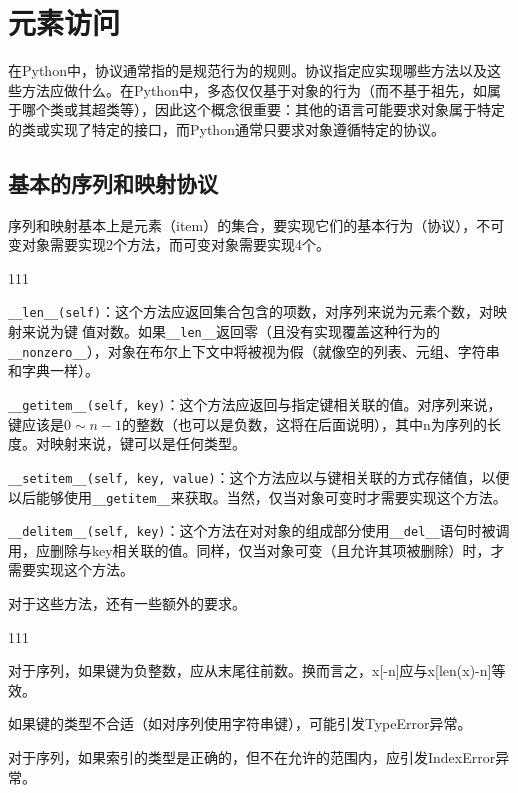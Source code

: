 \section{元素访问}
\begin{tcolorbox}
在Python中，协议通常指的是规范行为的规则。协议指定应实现哪些方法以及这些方法应做什么。在Python中，多态仅仅基于对象的行为（而不基于祖先，如属于哪个类或其超类等），因此这个概念很重要：其他的语言可能要求对象属于特定的类或实现了特定的接口，而Python通常只要求对象遵循特定的协议。
\end{tcolorbox}

\subsection{基本的序列和映射协议}
序列和映射基本上是元素（item）的集合，要实现它们的基本行为（协议），不可变对象需要实现2个方法，而可变对象需要实现4个。

\begin{dinglist}{111}
	\item \verb|__len__(self)|：这个方法应返回集合包含的项数，对序列来说为元素个数，对映射来说为键值对数。如果\verb|__len__|返回零（且没有实现覆盖这种行为的\verb|__nonzero__|），对象在布尔上下文中将被视为假（就像空的列表、元组、字符串和字典一样）。
	\item \verb|__getitem__(self, key)|：这个方法应返回与指定键相关联的值。对序列来说，键应该是$0\sim n-1$的整数（也可以是负数，这将在后面说明），其中n为序列的长度。对映射来说，键可以是任何类型。
	\item \verb|__setitem__(self, key, value)|：这个方法应以与键相关联的方式存储值，以便以后能够使用\verb|__getitem__|来获取。当然，仅当对象可变时才需要实现这个方法。
	\item \verb|__delitem__(self, key)|：这个方法在对对象的组成部分使用\verb|__del__|语句时被调用，应删除与key相关联的值。同样，仅当对象可变（且允许其项被删除）时，才需要实现这个方法。
\end{dinglist}

对于这些方法，还有一些额外的要求。
\begin{dinglist}{111}
\item 对于序列，如果键为负整数，应从末尾往前数。换而言之，x[-n]应与x[len(x)-n]等效。
\item 如果键的类型不合适（如对序列使用字符串键），可能引发TypeError异常。
\item 对于序列，如果索引的类型是正确的，但不在允许的范围内，应引发IndexError异常。
\end{dinglist}

